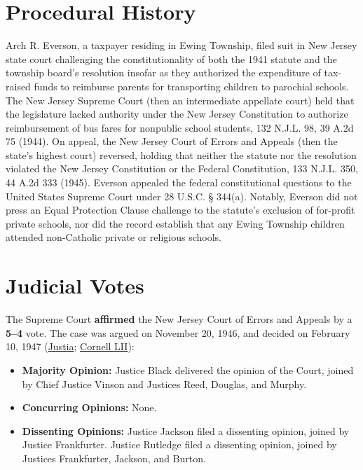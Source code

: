 \documentclass[12pt]{article}
\begin{document}
\section{Procedural History}
Arch R. Everson, a taxpayer residing in Ewing Township, filed suit in New Jersey state court challenging the constitutionality of both the 1941 statute and the township board's resolution insofar as they authorized the expenditure of tax-raised funds to reimburse parents for transporting children to parochial schools. The New Jersey Supreme Court (then an intermediate appellate court) held that the legislature lacked authority under the New Jersey Constitution to authorize reimbursement of bus fares for nonpublic school students, 132 N.J.L. 98, 39 A.2d 75 (1944). On appeal, the New Jersey Court of Errors and Appeals (then the state's highest court) reversed, holding that neither the statute nor the resolution violated the New Jersey Constitution or the Federal Constitution, 133 N.J.L. 350, 44 A.2d 333 (1945). Everson appealed the federal constitutional questions to the United States Supreme Court under 28 U.S.C. \S{} 344(a). Notably, Everson did not press an Equal Protection Clause challenge to the statute's exclusion of for-profit private schools, nor did the record establish that any Ewing Township children attended non-Catholic private or religious schools.

\section{Judicial Votes}
The Supreme Court \textbf{affirmed} the New Jersey Court of Errors and Appeals by a \textbf{5--4} vote. The case was argued on November 20, 1946, and decided on February 10, 1947 (\href{https://supreme.justia.com/cases/federal/us/330/1/}{Justia}; \href{https://www.law.cornell.edu/supremecourt/text/330/1}{Cornell LII}):

\begin{itemize}
    \item \textbf{Majority Opinion:} Justice Black delivered the opinion of the Court, joined by Chief Justice Vinson and Justices Reed, Douglas, and Murphy.
    \item \textbf{Concurring Opinions:} None.
    \item \textbf{Dissenting Opinions:} Justice Jackson filed a dissenting opinion, joined by Justice Frankfurter. Justice Rutledge filed a dissenting opinion, joined by Justices Frankfurter, Jackson, and Burton.
\end{itemize}
\end{document}
